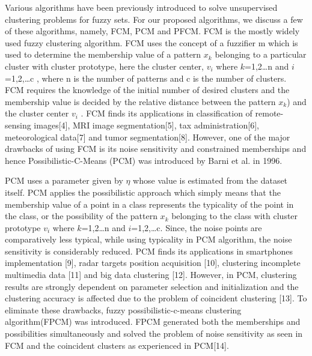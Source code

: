\documentclass[journal, onecolumn]{IEEEtran}
\begin{document}
Various algorithms have been previously introduced to solve unsupervised clustering problems for fuzzy sets. For our proposed algorithms, we discuss a few of these algorithms, namely, FCM, PCM and PFCM.  FCM is the mostly widely used fuzzy clustering algorithm. FCM uses the concept of a fuzzifier m which is used to determine the membership value of a pattern $x_k$ belonging to a particular cluster with cluster prototype, here the cluster center, $v_i$ where $k$=1,2…n and $i$=1,2,…c , where n is the number of patterns and c is the number of clusters. FCM requires the knowledge of the initial number of desired clusters and the membership value is decided by the relative distance between the pattern $x_k$)  and the cluster center $v_i$ . FCM finds its applications in classification of remote-sensing images[4], MRI image segmentation[5], tax administration[6], meteorological data[7] and tumor segmentation[8]. However, one of the major drawbacks of using FCM is its noise sensitivity and constrained memberships and hence Possibilistic-C-Means (PCM) was introduced by Barni et al. in 1996. 


PCM uses a parameter given by $\eta$ whose value is estimated from the dataset itself. PCM applies the possibilistic approach which simply means that the membership value of a point in a class represents the typicality of the point in the class, or the possibility of the pattern $x_k$ belonging to the class with cluster prototype $v_i$ where $k$=1,2…n and $i$=1,2,…c. Since, the noise points are comparatively less typical, while using typicality in PCM algorithm, the noise sensitivity is considerably reduced. PCM finds its applications in smartphones implementation [9], radar targets position acquisition [10], clustering incomplete multimedia data [11] and big data clustering [12]. However, in PCM, clustering results are strongly dependent on parameter selection and initialization and the clustering accuracy is affected due to the problem of coincident clustering [13]. To eliminate these drawbacks, fuzzy possibilistic-c-means clustering algorithm(FPCM) was introduced. FPCM generated both the memberships and possibilities simultaneously and solved the problem of noise sensitivity as seen in FCM and the coincident clusters as experienced in PCM[14]. 
\end{document}

